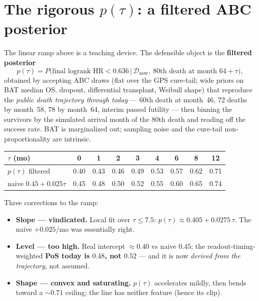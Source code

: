 \documentclass[11pt]{article}
\begin{document}
\section*{The rigorous $p(\tau)$: a filtered ABC posterior}

The linear ramp above is a teaching device. The defensible object is the \textbf{filtered
posterior}
\[
  p(\tau)=P\!\big(\text{final logrank HR}<0.636 \,\big|\, \mathcal{D}_{\text{now}},\
  \text{80th death at month } 64+\tau\big),
\]
obtained by accepting ABC draws (flat over the GPS cure-tail; wide priors on BAT median OS,
dropout, differential transplant, Weibull shape) that reproduce the \emph{public death
trajectory through today} --- 60th death at month~46, 72 deaths by month~58, 78 by month~64,
interim passed futility --- then binning the survivors by the simulated arrival month of the
80th death and reading off the success rate. BAT is marginalized out; sampling noise and the
cure-tail non-proportionality are intrinsic.

\begin{center}
\begin{tabular}{lcccccccc}
\toprule
$\tau$ (mo) & 0 & 1 & 2 & 3 & 4 & 6 & 8 & 12 \\
\midrule
$p(\tau)$ filtered & 0.40 & 0.43 & 0.46 & 0.49 & 0.53 & 0.57 & 0.62 & 0.71 \\
naive $0.45+0.025\tau$ & 0.45 & 0.48 & 0.50 & 0.52 & 0.55 & 0.60 & 0.65 & 0.74 \\
\bottomrule
\end{tabular}
\end{center}

\noindent Three corrections to the ramp:
\begin{itemize}[leftmargin=1.4em,itemsep=2pt]
  \item \textbf{Slope --- vindicated.} Local fit over $\tau\le 7.5$:
        $p(\tau)\approx 0.405 + 0.0275\,\tau$. The naive $+0.025/\text{mo}$ was essentially right.
  \item \textbf{Level --- too high.} Real intercept $\approx 0.40$ vs naive $0.45$; the
        readout-timing-weighted \textbf{PoS today is $0.48$, not $0.52$} --- and it is now
        \emph{derived from the trajectory}, not assumed.
  \item \textbf{Shape --- convex and saturating.} $p(\tau)$ accelerates mildly, then bends
        toward a $\sim\!0.71$ ceiling; the line has neither feature (hence its $\mathrm{clip}$).
\end{itemize}
\end{document}
